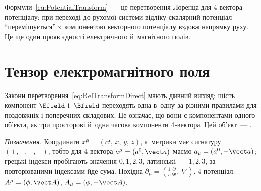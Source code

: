 Формули~\eqref{eq:PotentialTransform}~--- це перетворення Лоренца для 4-вектора потенціалу: при переході
до рухомої системи відліку скалярний потенціал \enquote{перемішується} з~компонентою
векторного потенціалу вздовж напрямку руху. Це ще один прояв єдності електричного й~магнітного полів.

\section{Тензор електромагнітного поля\ExtraMark}\hypertarget{em-field-tensor}{}
\begin{Extra}


Закони перетворення~\eqref{eq:RelTransformDirect} мають дивний вигляд: шість компонент
$\Efield$ і~$\Bfield$ переходять одна в~одну за різними правилами для поздовжніх і
поперечних складових. Це означає, що вони є компонентами одного об'єкта, як три просторові
й~одна часова компоненти 4-вектора. Цей об'єкт~--- .

\emph{Позначення.} Координати $x^\mu = (ct,\,x,\,y,\,z)$, а~метрика має сигнатуру
$(+,-,-,-)$, тобто для 4-вектора $a^\mu = (a^0, \vect a)$ маємо $a_\mu = (a^0, -\vect a)$;
грецькі індекси пробігають значення $0,1,2,3$, латинські~--- $1,2,3$, за повторюваними
індексами йде сума. Похідна $\partial_\mu = \left(\frac{1}{c}\frac{\partial}{\partial t},\
\nabla\right)$. 4-потенціал: $A^\mu = (\phi, \vect A)$, $A_\mu = (\phi, -\vect A)$.


\end{Extra}
